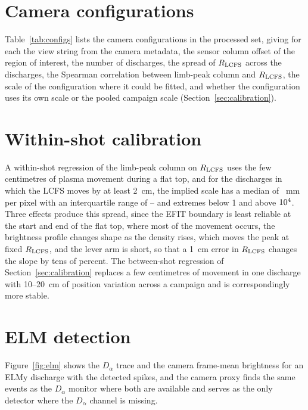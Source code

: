 \section{Camera configurations}
\label{app:views}
Table~\ref{tab:configs} lists the camera configurations in the processed set, giving for each the view string from the camera metadata, the sensor column offset of the region of interest, the number of discharges, the spread of $R_{\rm LCFS}$ across the discharges, the Spearman correlation between limb-peak column and $R_{\rm LCFS}$, the scale of the configuration where it could be fitted, and whether the configuration uses its own scale or the pooled campaign scale (Section~\ref{sec:calibration}).

\begin{table}[h]
\centering
\scriptsize

\caption{Camera configurations and their calibration, where a configuration uses its own scale when it has at least 8 discharges, at least 3~cm of spread in $R_{\rm LCFS}$, a correlation of the right sign with $|\rho| \ge 0.5$, and a bootstrap interval that excludes zero.}
\label{tab:configs}
\end{table}

\section{Within-shot calibration}
\label{app:calibration}
A within-shot regression of the limb-peak column on $R_{\rm LCFS}$ uses the few centimetres of plasma movement during a flat top, and for the \nWithinShot{} discharges in which the LCFS moves by at least 2~cm, the implied scale has a median of \withinScaleMed{}~mm per pixel with an interquartile range of \withinScaleQLo--\withinScaleQHi{} and extremes below 1 and above $10^{4}$. Three effects produce this spread, since the EFIT boundary is least reliable at the start and end of the flat top, where most of the movement occurs, the brightness profile changes shape as the density rises, which moves the peak at fixed $R_{\rm LCFS}$, and the lever arm is short, so that a 1~cm error in $R_{\rm LCFS}$ changes the slope by tens of percent. The between-shot regression of Section~\ref{sec:calibration} replaces a few centimetres of movement in one discharge with 10--20~cm of position variation across a campaign and is correspondingly more stable.

\section{ELM detection}
\label{app:elm}
Figure~\ref{fig:elm} shows the $D_\alpha$ trace and the camera frame-mean brightness for an ELMy discharge with the detected spikes, and the camera proxy finds the same events as the $D_\alpha$ monitor where both are available and serves as the only detector where the $D_\alpha$ channel is missing.

